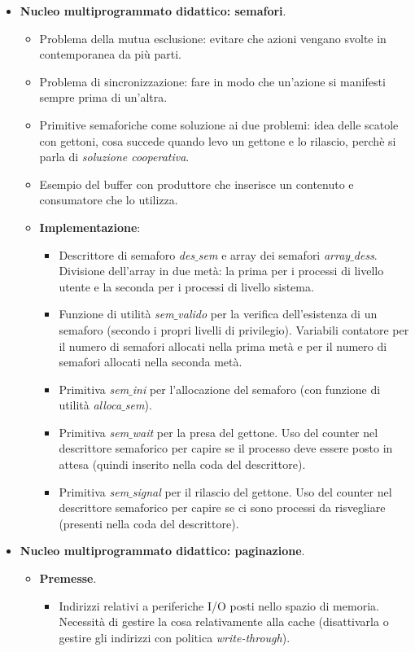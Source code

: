 \documentclass[11pt]{report}
\theoremstyle{definition}
\begin{document}
\begin{itemize}
	\item \textbf{Nucleo multiprogrammato didattico: semafori}.
	\begin{itemize}
		\item Problema della mutua esclusione: evitare che azioni vengano svolte in contemporanea da più parti.
		\item Problema di sincronizzazione: fare in modo che un'azione si manifesti sempre prima di un'altra.
		\item Primitive semaforiche come soluzione ai due problemi: idea delle scatole con gettoni, cosa succede quando levo un gettone e lo rilascio, perchè si parla di \emph{soluzione cooperativa}.
		\item Esempio del buffer con produttore che inserisce un contenuto e consumatore che lo utilizza. 
		\item \textbf{Implementazione}:
		\begin{itemize}
			\item Descrittore di semaforo \emph{des$\_$sem} e array dei semafori \emph{array$\_$dess}. Divisione dell'array in due metà: la prima per i processi di livello utente e la seconda per i processi di livello sistema.
			\item Funzione di utilità \emph{sem$\_$valido} per la verifica dell'esistenza di un semaforo (secondo i propri livelli di privilegio). Variabili contatore per il numero di semafori allocati nella prima metà e per il numero di semafori allocati nella seconda metà.
			\item Primitiva \emph{sem$\_$ini} per l'allocazione del semaforo (con funzione di utilità \emph{alloca$\_$sem}).
			\item Primitiva \emph{sem$\_$wait} per la presa del gettone. Uso del counter nel descrittore semaforico per capire se il processo deve essere posto in attesa (quindi inserito nella coda del descrittore).
			\item Primitiva  \emph{sem$\_$signal} per il rilascio del gettone. Uso del counter nel descrittore semaforico per capire se ci sono processi da risvegliare (presenti nella coda del descrittore).
		\end{itemize}
	\end{itemize}
	\item \textbf{Nucleo multiprogrammato didattico: paginazione}.
	\begin{itemize}
		\item \textbf{Premesse}. 
		\begin{itemize}
			\item Indirizzi relativi a periferiche I/O posti nello spazio di memoria. Necessità di gestire la cosa relativamente alla cache (disattivarla o gestire gli indirizzi con politica \emph{write-through}).

\end{itemize}
\end{itemize}
\end{itemize}
\end{document}
